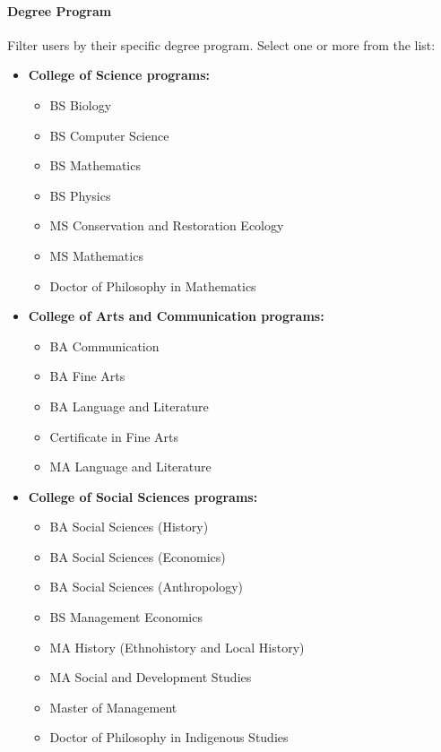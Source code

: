 \documentclass[12pt, a4paper]{article}
\begin{document}
\paragraph{Degree Program}
Filter users by their specific degree program. Select one or more from the list:
\begin{itemize}[leftmargin=1.5em]
  \item \textbf{College of Science programs:}
  \begin{itemize}[leftmargin=1.5em]
    \item BS Biology
    \item BS Computer Science
    \item BS Mathematics
    \item BS Physics
    \item MS Conservation and Restoration Ecology
    \item MS Mathematics
    \item Doctor of Philosophy in Mathematics
  \end{itemize}
  \item \textbf{College of Arts and Communication programs:}
  \begin{itemize}[leftmargin=1.5em]
    \item BA Communication
    \item BA Fine Arts
    \item BA Language and Literature
    \item Certificate in Fine Arts
    \item MA Language and Literature
  \end{itemize}
  \item \textbf{College of Social Sciences programs:}
  \begin{itemize}[leftmargin=1.5em]
    \item BA Social Sciences (History)
    \item BA Social Sciences (Economics)
    \item BA Social Sciences (Anthropology)
    \item BS Management Economics
    \item MA History (Ethnohistory and Local History)
    \item MA Social and Development Studies
    \item Master of Management
    \item Doctor of Philosophy in Indigenous Studies
  \end{itemize}
\end{itemize}
\end{document}
